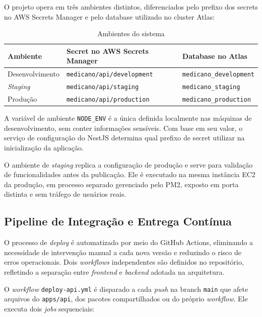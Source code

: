 O projeto opera em três ambientes distintos,
diferenciados pelo prefixo dos secrets no
AWS Secrets Manager e pelo database utilizado
no cluster Atlas:

\begin{table}[H]
  \centering
  \caption{Ambientes do sistema}
  \label{tab:environments}
  \begin{tabular}{p{2.5cm}p{4cm}p{5cm}}
    \toprule
    \textbf{Ambiente} &
    \textbf{Secret no AWS Secrets Manager} &
    \textbf{Database no Atlas} \\
    \midrule
    Desenvolvimento
      & \texttt{medicano/api/development}
      & \texttt{medicano\_development} \\
    \textit{Staging}
      & \texttt{medicano/api/staging}
      & \texttt{medicano\_staging} \\
    Produção
      & \texttt{medicano/api/production}
      & \texttt{medicano\_production} \\
    \bottomrule
  \end{tabular}
\end{table}

A variável de ambiente \texttt{NODE\_ENV} é a
única definida localmente nas máquinas de
desenvolvimento, sem conter informações sensíveis.
Com base em seu valor, o serviço de configuração
do NestJS determina qual prefixo de secret utilizar
na inicialização da aplicação.

O ambiente de \textit{staging} replica a
configuração de produção e serve para validação
de funcionalidades antes da publicação. Ele é
executado na mesma instância EC2 da produção,
em processo separado gerenciado pelo PM2, exposto
em porta distinta e sem tráfego de usuários reais.

\subsection{Pipeline de Integração e Entrega Contínua}
\label{subsec:cicd}

O processo de \textit{deploy} é automatizado por meio
do GitHub Actions, eliminando a necessidade de intervenção
manual a cada nova versão e reduzindo o risco de erros
operacionais. Dois \textit{workflows} independentes são
definidos no repositório, refletindo a separação entre
\textit{frontend} e \textit{backend} adotada na arquitetura.

O \textit{workflow} \texttt{deploy-api.yml} é disparado a
cada \textit{push} na branch \texttt{main} que afete
arquivos do \texttt{apps/api}, dos pacotes compartilhados
ou do próprio \textit{workflow}. Ele executa dois
\textit{jobs} sequenciais:

